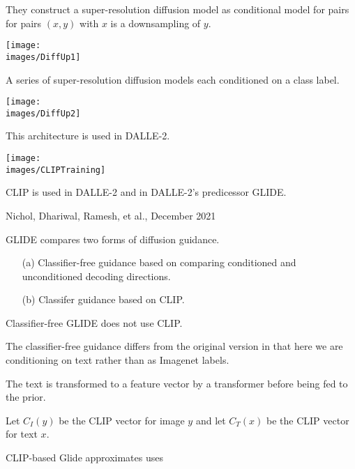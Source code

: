 {

They construct a super-resolution diffusion model as conditional model for pairs for pairs $(x,y)$ with $x$ is a downsampling of $y$.

\vfill
\centerline{\texttt{[image: \\images/DiffUp1]}}


A series of super-resolution diffusion models each conditioned on a class label.

\centerline{\texttt{[image: \\images/DiffUp2]}}

\vfill
This architecture is used in DALLE-2.


\centerline{\texttt{[image: \\images/CLIPTraining]}}

\vfill
CLIP is used in DALLE-2 and in DALLE-2's predicessor GLIDE.

         {Nichol, Dhariwal, Ramesh, et al., December 2021}

GLIDE compares two forms of diffusion guidance.

\vfill
\begin{itemize}
\item[(a)] Classifier-free guidance based on comparing conditioned and unconditioned decoding directions.

\vfill
\item[(b)] Classifer guidance based on CLIP.
\end{itemize}


\vfill
Classifier-free GLIDE does not use CLIP.

\vfill
The classifier-free guidance differs from the original version in that here we are conditioning on text
rather than as Imagenet labels.

\vfill
The text is transformed to a feature vector by a transformer before being fed to the prior.


Let $C_I(y)$ be the CLIP vector for image $y$ and let $C_T(x)$ be the CLIP vector for text $x$.

\vfill
CLIP-based Glide approximates uses

}
